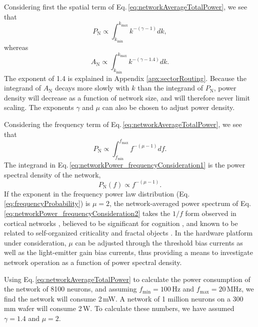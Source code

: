 \documentclass[twocolumn]{article}
\begin{document}
Considering first the spatial term of Eq.\,\ref{eq:networkAverageTotalPower}, we see that 
\begin{equation}
\label{eq:networkPower_spatialConsideration1}
P_{\mathrm{N}} \propto \int_{k_{\mathrm{min}}}^{k_{\mathrm{max}}} k^{-(\gamma-1)}dk, 
\end{equation}
whereas
\begin{equation}
\label{eq:networkPower_spatialConsideration2}
A_{\mathrm{N}} \propto \int_{k_{\mathrm{min}}}^{k_{\mathrm{max}}} k^{-(\gamma-1.4)}dk. 
\end{equation}
The exponent of 1.4 is explained in Appendix \ref{apx:sectorRouting}. Because the integrand of $A_{\mathrm{N}}$ decays more slowly with $k$ than the integrand of $P_{\mathrm{N}}$, power density will decrease as a function of network size, and will therefore never limit scaling. The exponents $\gamma$ and $\mu$ can also be chosen to adjust power density.

Considering the frequency term of Eq.\,\ref{eq:networkAverageTotalPower}, we see that 
\begin{equation}
\label{eq:networkPower_frequencyConsideration1}
P_{\mathrm{N}} \propto \int_{f_{\mathrm{min}}}^{f_{\mathrm{max}}} f^{-(\mu-1)}df. 
\end{equation}
The integrand in Eq.\,\ref{eq:networkPower_frequencyConsideration1} is the power spectral density of the network, 
\begin{equation}
\label{eq:networkPower_frequencyConsideration2}
P_{\mathrm{N}}(f) \propto f^{-(\mu-1)}. 
\end{equation}
If the exponent in the frequency power law distribution (Eq.\,\ref{eq:frequencyProbability}) is $\mu = 2$, the network-averaged power spectrum of Eq. \ref{eq:networkPower_frequencyConsideration2} takes the $1/f$ form observed in cortical networks \cite{budr2004}, believed to be significant for cognition \cite{bu2006}, and known to be related to self-organized criticality and fractal objects \cite{be2007,bata1987,yara2017}. In the hardware platform under consideration, $\mu$ can be adjusted through the threshold bias currents as well as the light-emitter gain bias currents, thus providing a means to investigate network operation as a function of power spectral density.

Using Eq.\,\ref{eq:networkAverageTotalPower} to calculate the power consumption of the network of 8100 neurons, and assuming $f_{\mathrm{min}} = 100$\,Hz and $f_{\mathrm{max}} = 20$\,MHz, we find the network will consume 2\,mW. A network of 1 million neurons on a 300\,mm wafer will consume 2\,W. To calculate these numbers, we have assumed $\gamma = 1.4$ and $\mu  = 2$.



\end{document}
